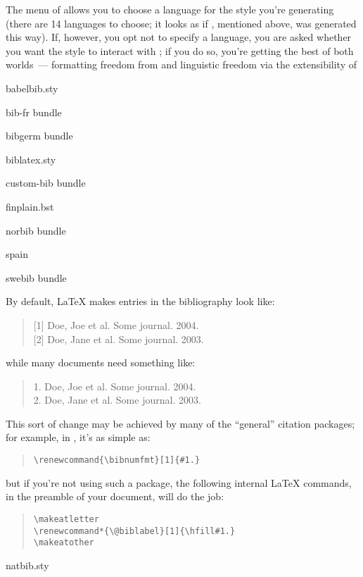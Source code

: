 The  menu of  allows you to
choose a language for the \BibTeX{} style you're generating (there are
14 languages to choose; it looks as if , mentioned
above, was generated this way).  If, however, you opt not to specify a
language, you are asked whether you want the style to interact with
; if you do so, you're getting the best of both
worlds~--- formatting freedom from  and linguistic
freedom via the extensibility of 
\begin{ctanrefs}
\item[babelbib.sty]
\item[bib-fr \nothtml{\rmfamily\upshape}bundle]
\item[bibgerm \nothtml{\rmfamily\upshape}bundle]
\item[biblatex.sty]
\item[custom-bib \nothtml{\rmfamily\upshape}bundle]
\item[finplain.bst]
\item[norbib \nothtml{\rmfamily\upshape}bundle]
\item[spain]
\item[swebib \nothtml{\rmfamily\upshape}bundle]
\end{ctanrefs}


By default, \LaTeX{} makes entries in the bibliography look like:
\begin{quote}
  [1] Doe, Joe et al.  Some journal.  2004.\\{}
  [2] Doe, Jane et al. Some journal. 2003.
\end{quote}
while many documents need something like:
\begin{quote}
  1. Doe, Joe et al.  Some journal.  2004.\\
  2. Doe, Jane et al. Some journal. 2003.
\end{quote}

This sort of change may be achieved by many of the ``general''
citation packages; for example, in , it's as simple as:
\begin{quote}
\begin{verbatim}
\renewcommand{\bibnumfmt}[1]{#1.}
\end{verbatim}
\end{quote}
but if you're not using such a package, the following internal
\LaTeX{} commands, in the preamble of your document, will do the job:
\begin{quote}
\begin{verbatim}
\makeatletter
\renewcommand*{\@biblabel}[1]{\hfill#1.}
\makeatother
\end{verbatim}
\end{quote}
\begin{ctanrefs}
\item[natbib.sty]
\end{ctanrefs}

